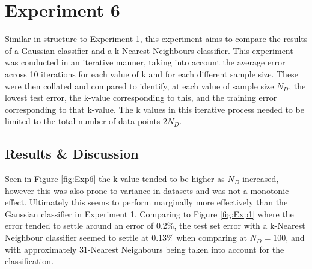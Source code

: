 \section{Experiment 6}
Similar in structure to Experiment 1, this experiment aims to compare the results of a Gaussian classifier  and a k-Nearest Neighbours classifier. This experiment was conducted in an iterative manner, taking into account the average error across 10 iterations for each value of k and for each different sample size. These were then collated and compared to identify, at each value of sample size $N_{D}$, the lowest test error, the k-value corresponding to this, and the training error corresponding to that k-value. The k values in this iterative process needed to be limited to the total number of data-points $2N_{D}$. 


\subsection{Results \& Discussion}
Seen in Figure \ref{fig:Exp6} the k-value tended to be higher as $N_{D}$ increased, however this was also prone to variance in datasets and was not a monotonic effect. Ultimately this seems to perform marginally more effectively than the Gaussian classifier in Experiment 1. Comparing to Figure \ref{fig:Exp1} where the error tended to settle around an error of 0.2\%, the test set error with a k-Nearest Neighbour classifier seemed to settle at 0.13\% when comparing at $N_{D} = 100$, and with approximately 31-Nearest Neighbours being taken into account for the classification.

